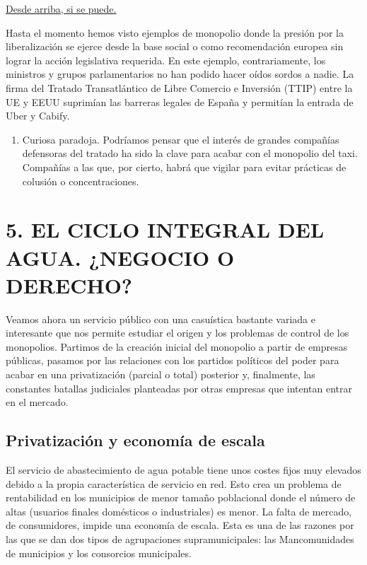 \documentclass[
]{article}
\providecommand{\tightlist}{%
  \setlength{\itemsep}{0pt}\setlength{\parskip}{0pt}}
\begin{document}
\ul{Desde arriba, si se puede.}

Hasta el momento hemos visto ejemplos de monopolio donde la presión por
la liberalización se ejerce desde la base social o como recomendación
europea sin lograr la acción legislativa requerida. En este ejemplo,
contrariamente, los ministros y grupos parlamentarios no han podido
hacer oídos sordos a nadie. La firma del Tratado Transatlántico de Libre
Comercio e Inversión (TTIP) entre la UE y EEUU suprimían las barreras
legales de España y permitían la entrada de Uber y Cabify.

\begin{enumerate}
\def\labelenumi{\arabic{enumi}.}
\tightlist
\item
  Curiosa paradoja. Podríamos pensar que el interés de grandes compañías
  defensoras del tratado ha sido la clave para acabar con el monopolio
  del taxi. Compañías a las que, por cierto, habrá que vigilar para
  evitar prácticas de colusión o concentraciones.
\end{enumerate}

\hypertarget{el-ciclo-integral-del-agua.-negocio-o-derecho}{%
\section{5. EL CICLO INTEGRAL DEL AGUA. ¿NEGOCIO O
DERECHO?}\label{el-ciclo-integral-del-agua.-negocio-o-derecho}}

Veamos ahora un servicio público con una casuística bastante variada e
interesante que nos permite estudiar el origen y los problemas de
control de los monopolios. Partimos de la creación inicial del monopolio
a partir de empresas públicas, pasamos por las relaciones con los
partidos políticos del poder para acabar en una privatización (parcial o
total) posterior y, finalmente, las constantes batallas judiciales
planteadas por otras empresas que intentan entrar en el mercado.

\hypertarget{privatizaciuxf3n-y-economuxeda-de-escala}{%
\subsection{Privatización y economía de
escala}\label{privatizaciuxf3n-y-economuxeda-de-escala}}

El servicio de abastecimiento de agua potable tiene unos costes fijos
muy elevados debido a la propia característica de servicio en red. Esto
crea un problema de rentabilidad en los municipios de menor tamaño
poblacional donde el número de altas (usuarios finales domésticos o
industriales) es menor. La falta de mercado, de consumidores, impide una
economía de escala. Esta es una de las razones por las que se dan dos
tipos de agrupaciones supramunicipales: las Mancomunidades de municipios
y los consorcios municipales.
\end{document}
